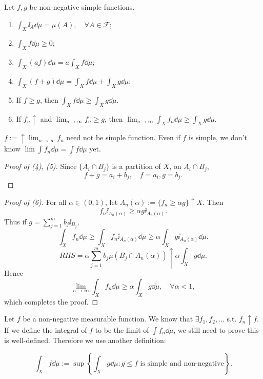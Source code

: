 \begin{proposition}
	Let $f,g$ be non-negative simple functions.
	\begin{enumerate}[(1)]
		\item $\int_X \ii_A \dd \mu = \mu(A),\quad \forall A\in \mathscr{F}$;
		\item $\int_X f\dd \mu \ge 0$;
		\item $\int_X (af)\dd \mu = a\int_X f\dd \mu$;
		\item $\int_X (f+g)\dd \mu = \int_X f\dd \mu + \int_X g\dd \mu$;
		\item If  $f\ge g$, then $\int_X f\dd \mu\ge \int_X g\dd \mu$.
		\item If $f_n\uparrow$ and $ \lim_{n\to \infty} f_n \ge g$,
			then $ \lim_{n\to \infty}\int_X f_n\dd \mu \ge \int_X g\dd \mu$.
	\end{enumerate}
\end{proposition}
\begin{remark}
    $f:= \uparrow \lim_{n\to \infty} f_n$ need not be simple function.
	Even if $f$ is simple, we don't know $\lim \int f_n\dd \mu = \int f\dd \mu$ yet.
\end{remark}
\begin{proof}[Proof of (4), (5)]
    Since $\{A_i\cap B_j\}$ is a partition of $X$, on  $A_i\cap B_j$,
	\[
	f + g = a_i +b_j, \quad f = a_i, g = b_j.
	\]
\end{proof}
\begin{proof}[Proof of (6)]
    For all $\alpha\in (0,1)$, let $A_n(\alpha) := \{f_n \ge \alpha g\}\uparrow X$.
	Then
	\[
	f_n \ii_{A_n(\alpha)} \ge \alpha g\ii_{A_n(\alpha)}.
	\]
	Thus if $g = \sum_{j=1}^{m} b_j \ii_{B_j}$,
	\[
	\int_X f_n \dd \mu\ge \int_X f_n\ii_{A_n(\alpha)}\dd \mu
	\ge \alpha \int_X g\ii_{A_n(\alpha)}\dd \mu.
	\]
	\[
	RHS = \alpha \sum_{j=1}^{m} b_j\mu(B_j\cap A_n(\alpha))
	\uparrow \alpha\int_X g\dd \mu.
	\]
	Hence
	\[
	\lim_{n\to \infty} \int_X f_n \dd \mu \ge \alpha\int_X g\dd \mu,
	\quad \forall \alpha<1,
	\]
	which completes the proof.
\end{proof}

\begin{definition}
	Let $f$ be a non-negative measurable function.
	We know that $\exists f_1,f_2,\dots$ s.t. $f_n \uparrow f$.
	If we define the integral of $f$ to be the limit of $\int f_n\dd \mu$,
	we still need to prove this is well-defined. Therefore we use another definition:

	\[
	\int_X f\dd \mu := \sup\left\{\int _X g\dd \mu : g\le f
	\text{ is simple and non-negative}\right\}.
	\]
\end{definition}

